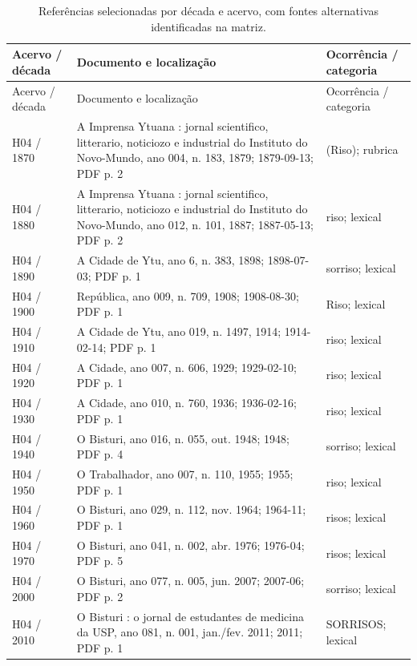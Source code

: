 \small\begin{longtable}{>{\raggedright\arraybackslash}p{}>{\raggedright\arraybackslash}p{}>{\raggedright\arraybackslash}p{}}
\caption{Referências selecionadas por década e acervo, com fontes alternativas identificadas na matriz.}\\
\toprule Acervo / década & Documento e localização & Ocorrência / categoria\\\midrule\endfirsthead
\toprule Acervo / década & Documento e localização & Ocorrência / categoria\\\midrule\endhead
H04 / 1870 & A Imprensa Ytuana : jornal scientifico, litterario, noticiozo e industrial do Instituto do Novo-Mundo, ano 004, n. 183, 1879; 1879-09-13; PDF p. 2 & (Riso); rubrica \cite{r3doc1} \\
H04 / 1880 & A Imprensa Ytuana : jornal scientifico, litterario, noticiozo e industrial do Instituto do Novo-Mundo, ano 012, n. 101, 1887; 1887-05-13; PDF p. 2 & riso; lexical \cite{r3doc2} \\
H04 / 1890 & A Cidade de Ytu, ano 6, n. 383, 1898; 1898-07-03; PDF p. 1 & sorriso; lexical \cite{r3doc3} \\
H04 / 1900 & República, ano 009, n. 709, 1908; 1908-08-30; PDF p. 1 & Riso; lexical \cite{r3doc4} \\
H04 / 1910 & A Cidade de Ytu, ano 019, n. 1497, 1914; 1914-02-14; PDF p. 1 & riso; lexical \cite{r3doc5} \\
H04 / 1920 & A Cidade, ano 007, n. 606, 1929; 1929-02-10; PDF p. 1 & riso; lexical \cite{r3doc6} \\
H04 / 1930 & A Cidade, ano 010, n. 760, 1936; 1936-02-16; PDF p. 1 & riso; lexical \cite{r3doc7} \\
H04 / 1940 & O Bisturi, ano 016, n. 055, out. 1948; 1948; PDF p. 4 & sorriso; lexical \cite{r3doc8} \\
H04 / 1950 & O Trabalhador, ano 007, n. 110, 1955; 1955; PDF p. 1 & riso; lexical \cite{r3doc9} \\
H04 / 1960 & O Bisturi, ano 029, n. 112, nov. 1964; 1964-11; PDF p. 1 & risos; lexical \cite{r3doc10} \\
H04 / 1970 & O Bisturi, ano 041, n. 002, abr. 1976; 1976-04; PDF p. 5 & risos; lexical \cite{r3doc11} \\
H04 / 2000 & O Bisturi, ano 077, n. 005, jun. 2007; 2007-06; PDF p. 2 & sorriso; lexical \cite{r3doc12} \\
H04 / 2010 & O Bisturi : o jornal de estudantes de medicina da USP, ano 081, n. 001, jan./fev. 2011; 2011; PDF p. 1 & SORRISOS; lexical \cite{r3doc13} \\

\end{longtable}
